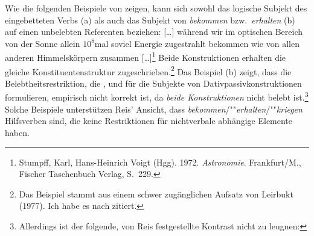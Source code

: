 Wie die folgenden Beispiele von \citet[]{Leirbukt87} zeigen,
kann sich sowohl das logische Subjekt des eingebetteten Verbs (a)
als auch das Subjekt von \emph{bekommen} bzw.\ \emph{erhalten} (b) auf einen unbelebten Referenten beziehen:
\eal
\label{ex-zustrahlen-zuschreiben}
\ex{}
{}[\ldots] während wir im     optischen Bereich von  der Sonne allein $10^8$mal    soviel  Energie zugestrahlt
     bekommen wie von  allen anderen Himmelskörpern zusammen [\ldots]\footnote{
        Stumpff, Karl, Hans-Heinrich Voigt (Hgg). 1972.
        \emph{Astronomie}. Frankfurt/M., Fischer Taschenbuch Verlag, S.\, 229.%
}
\ex 
Beide Konstruktionen erhalten die gleiche Konstituentenstruktur zugeschrieben.\footnote{
        Das Beispiel stammt aus einem schwer zugänglichen Aufsatz von
        Leirbukt (1977). Ich habe es nach  zitiert.%
}
\zl
Das Beispiel (b) zeigt, dass die Belebtheitsrestriktion, 
die \citet[]{Reis76a}, \citet[]{Wegener86a} 
und \citet[]{Olsen97c} für die Subjekte von Dativpassivkonstruktionen formulieren,
empirisch nicht korrekt ist, da \emph{beide Konstruktionen} nicht belebt ist.\footnote{
        Allerdings ist der folgende, von Reis festgestellte Kontrast nicht zu leugnen:
        \eal
        \zllast
}
Solche Beispiele unterstützen Reis' Ansicht, dass \emph{bekommen}/""\emph{erhalten}/""\emph{kriegen} 
Hilfsverben sind, die keine Restriktionen für nichtverbale abhängige Elemente haben.



